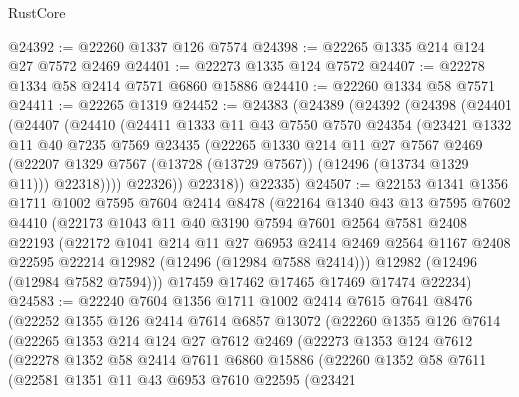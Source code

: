 \begin{lexlean}{RustCore}
\begin{coremodule}
@24392 := @22260 @1337 @126 @7574
@24398 := @22265 @1335 @214 @124 @27 @7572 @2469
@24401 := @22273 @1335 @124 @7572
@24407 := @22278 @1334 @58 @2414 @7571 @6860 @15886
@24410 := @22260 @1334 @58 @7571
@24411 := @22265 @1319
@24452 := @24383
    (@24389
      (@24392
        (@24398
          (@24401
            (@24407
              (@24410
                (@24411
                  @1333
                  @11
                  @43
                  @7550
                  @7570
                  @24354
                  (@23421
                    @1332
                    @11
                    @40
                    @7235
                    @7569
                    @23435
                    (@22265
                      @1330
                      @214
                      @11
                      @27
                      @7567
                      @2469
                      (@22207 @1329 @7567 (@13728 (@13729 @7567)) (@12496 (@13734 @1329 @11)))
                      @22318))))
              @22326))
          @22318))
      @22335)
@24507 := @22153
    @1341
    @1356
    @1711
    @1002
    @7595
    @7604
    @2414
    @8478
    (@22164
      @1340
      @43
      @13
      @7595
      @7602
      @4410
      (@22173
        @1043
        @11
        @40
        @3190
        @7594
        @7601
        @2564
        @7581
        @2408
        @22193
        (@22172
          @1041
          @214
          @11
          @27
          @6953
          @2414
          @2469
          @2564
          @1167
          @2408
          @22595
          @22214
          @12982
          (@12496 (@12984 @7588 @2414)))
        @12982
        (@12496 (@12984 @7582 @7594)))
      @17459
      @17462
      @17465
      @17469
      @17474
      @22234)
@24583 := @22240
    @7604
    @1356
    @1711
    @1002
    @2414
    @7615
    @7641
    @8476
    (@22252
      @1355
      @126
      @2414
      @7614
      @6857
      @13072
      (@22260
        @1355
        @126
        @7614
        (@22265
          @1353
          @214
          @124
          @27
          @7612
          @2469
          (@22273
            @1353
            @124
            @7612
            (@22278
              @1352
              @58
              @2414
              @7611
              @6860
              @15886
              (@22260
                @1352
                @58
                @7611
                (@22581
                  @1351
                  @11
                  @43
                  @6953
                  @7610
                  @22595
                  (@23421

\end{coremodule}
\end{lexlean}

